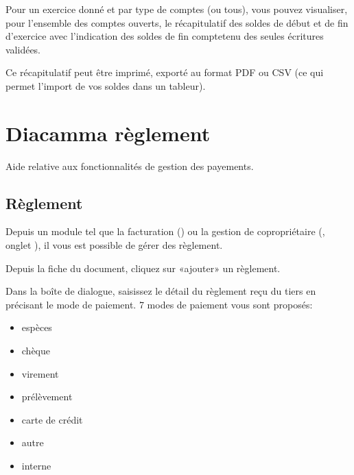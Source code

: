 \documentclass[a4paper,10pt,oneside,french]{sphinxmanual}
\begin{document}
\sphinxAtStartPar
Pour un exercice donné et par type de comptes (ou tous), vous pouvez visualiser, pour l’ensemble des comptes ouverts, le récapitulatif des soldes de début et de fin d’exercice avec l’indication des soldes de fin compte\sphinxhyphen{}tenu des seules écritures validées.

\sphinxAtStartPar
Ce récapitulatif peut être imprimé, exporté au format PDF ou CSV (ce qui permet l’import de vos soldes dans un tableur).


\chapter{Diacamma règlement}
\label{\detokenize{payoff/index:diacamma-reglement}}\label{\detokenize{payoff/index::doc}}
\sphinxAtStartPar
Aide relative aux fonctionnalités de gestion des payements.


\section{Règlement}
\label{\detokenize{payoff/payoff:reglement}}\label{\detokenize{payoff/payoff::doc}}
\sphinxAtStartPar
Depuis un module tel que la facturation () ou la gestion de copropriétaire (, onglet ), il vous est possible de gérer des règlement.

\sphinxAtStartPar
Depuis la fiche du document, cliquez sur «ajouter» un règlement.
\begin{quote}

\noindent{}
\end{quote}

\sphinxAtStartPar
Dans la boîte de dialogue, saisissez le détail du règlement reçu du tiers en précisant le mode de paiement.
7 modes de paiement vous sont proposés:
\begin{itemize}
\item {} 
\sphinxAtStartPar
espèces

\item {} 
\sphinxAtStartPar
chèque

\item {} 
\sphinxAtStartPar
virement

\item {} 
\sphinxAtStartPar
prélèvement

\item {} 
\sphinxAtStartPar
carte de crédit

\item {} 
\sphinxAtStartPar
autre

\item {} 
\sphinxAtStartPar
interne

\end{itemize}
\end{document}
